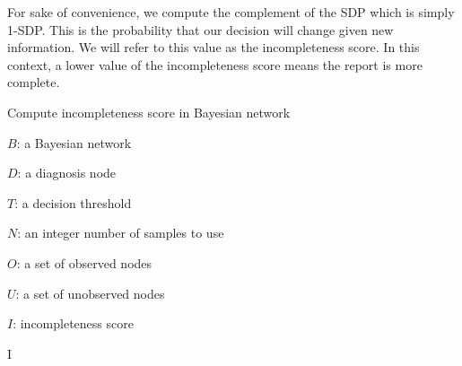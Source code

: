 For sake of convenience, we compute the complement of the SDP which is simply 1-SDP. This is the probability that our decision will change given new information. We will refer to this value as the incompleteness score. In this context, a lower value of the incompleteness score means the report is more complete.


\begin{algorithm}[h]
	\caption{Compute incompleteness score in Bayesian network}
	\label{algorithm:incompleteness}
	\begin{algorithmic}
		\Require
		
		$ B $: a Bayesian network
		
		$ D $: a diagnosis node
		
		$ T $: a decision threshold
		
		$ N $: an integer number of samples to use
		
		$ O $: a set of observed nodes
		
		$ U $: a set of unobserved nodes
		
		\Ensure $ I $: incompleteness score
		
		
		
		
			
			
			\EndIf
		\EndFor
		\State \Return I
		\EndFunction
		
	\end{algorithmic}
\end{algorithm}


